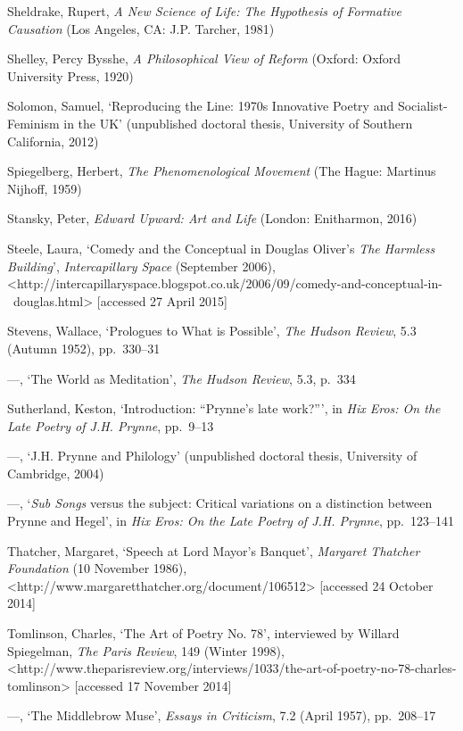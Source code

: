 \documentclass[]{article}
\begin{document}
Sheldrake, Rupert, \emph{A New Science of Life: The Hypothesis of
Formative Causation} (Los Angeles, CA: J.P. Tarcher, 1981)

Shelley, Percy Bysshe, \emph{A Philosophical View of Reform} (Oxford:
Oxford University Press, 1920)

Solomon, Samuel, ‘Reproducing the Line: 1970s Innovative Poetry and
Socialist-Feminism in the UK’ (unpublished doctoral thesis, University
of Southern California, 2012)

Spiegelberg, Herbert, \emph{The Phenomenological Movement} (The Hague:
Martinus Nijhoff, 1959)

Stansky, Peter, \emph{Edward Upward: Art and Life} (London: Enitharmon,
2016)

Steele, Laura, ‘Comedy and the Conceptual in Douglas Oliver’s \emph{The
Harmless Building}’, \emph{Intercapillary Space} (September 2006),\\
\textless{}http://intercapillaryspace.blogspot.co.uk/2006/09/comedy-and-conceptual-in-~douglas.html\textgreater{}
{[}accessed 27 April 2015{]}

Stevens, Wallace, ‘Prologues to What is Possible’, \emph{The Hudson
Review}, 5.3 (Autumn 1952), pp.~330–31

—, ‘The World as Meditation’, \emph{The Hudson Review}, 5.3, p.~334

Sutherland, Keston, ‘Introduction: “Prynne’s late work?”’, in \emph{Hix
Eros: On the Late Poetry of J.H. Prynne}, pp.~9–13

—, ‘J.H. Prynne and Philology’ (unpublished doctoral thesis, University
of Cambridge, 2004)

—, ‘\emph{Sub Songs} versus the subject: Critical variations on a
distinction between Prynne and Hegel’, in \emph{Hix Eros: On the Late
Poetry of J.H. Prynne}, pp.~123–141

Thatcher, Margaret, ‘Speech at Lord Mayor’s Banquet’, \emph{Margaret
Thatcher Foundation} (10 November 1986),\\
\textless{}http://www.margaretthatcher.org/document/106512\textgreater{}
{[}accessed 24 October 2014{]}

Tomlinson, Charles, ‘The Art of Poetry No. 78’, interviewed by Willard
Spiegelman, \emph{The Paris Review}, 149 (Winter 1998),\\
\textless{}http://www.theparisreview.org/interviews/1033/the-art-of-poetry-no-78-charles-tomlinson\textgreater{}
{[}accessed 17 November 2014{]}

—, ‘The Middlebrow Muse’, \emph{Essays in Criticism}, 7.2 (April 1957),
pp.~208–17
\end{document}
